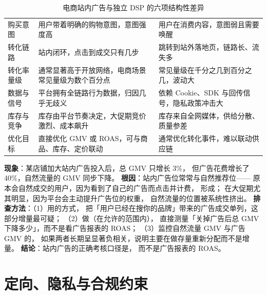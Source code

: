 \begin{table}[htbp]
\centering
\caption{电商站内广告与独立 DSP 的六项结构性差异}
\label{tab:retail-vs-dsp}
\small
\begin{tabularx}{\textwidth}{L{2.4cm} L{4.0cm} Y}
\toprule
{} &  &  \\
\midrule
购买意图 & 用户带着明确的购物意图，意图强度高 & 用户在消费内容，意图弱且需要唤醒 \\
\addlinespace
转化链路 & 站内闭环，点击到成交只有几步 & 跳转到站外落地页，链路长、流失多 \\
\addlinespace
转化率量级 & 通常显著高于开放网络，电商场景常见量级为数个百分点 & 常见量级在千分之几到百分之几，波动大 \\
\addlinespace
数据与信号 & 平台拥有全链路行为数据，归因几乎无歧义 & 依赖 Cookie、SDK 与回传信号，隐私政策冲击大 \\
\addlinespace
库存与竞争 & 库存由平台节奏决定，大促期竞价激烈、成本飙升 & 库存来自全网媒体，供给分散、质量参差 \\
\addlinespace
优化目标 & 直接优化 GMV 或 ROAS，可与商品、库存、定价联动 & 通常优化转化事件，难以联动供应链 \\
\bottomrule
\end{tabularx}
\end{table}

\begin{pitfall}
\textbf{现象}：某店铺加大站内广告投入后，总 GMV 只增长 3\%，
但广告花费增长了 40\%，自然流量的 GMV 同步下降。
\textbf{根因}：站内广告位常常与自然推荐位——
原本会自然成交的用户，因为看到了自己的广告而点击并计费，
形成；
在大促期尤其明显，因为平台会主动提升广告位的权重，
自然流量的位置被系统性挤出。
\textbf{排查方法}：（1）用的方式，
把「用户已经在搜你的品牌」带来的广告成交单列，这部分增量最可疑；
（2）做（在允许的范围内），
直接测量「关掉广告后总 GMV 下降多少」，而不是看广告报表的 ROAS；
（3）监控自然流量 GMV 与广告 GMV 的，
如果两者长期呈显著负相关，说明主要在做存量重新分配而不是增量。
\textbf{结论}：站内广告的正确考核口径是，
而不是广告报表的 ROAS。
\end{pitfall}

\section{定向、隐私与合规约束}

